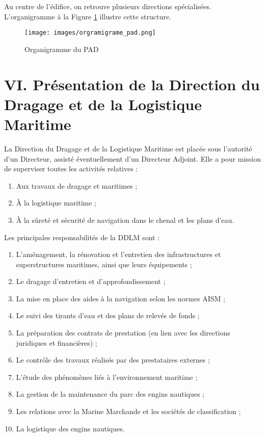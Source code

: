 \documentclass[a4paper,12pt,openany]{report}
\begin{document}
	Au centre de l’édifice, on retrouve plusieurs directions spécialisées. L'organigramme à la Figure \ref{Fig 2} illustre cette structure.
	
	\begin{figure}[h]
		\centering
		\texttt{[image: images/orgramigrame\_pad.png]}
		\caption{Organigramme du PAD \label{Fig 2}}
	\end{figure}
	
	\section*{VI. Présentation de la Direction du Dragage et de la Logistique Maritime }
	
	La Direction du Dragage et de la Logistique Maritime   est placée sous l’autorité d’un Directeur, assisté éventuellement d’un Directeur Adjoint. Elle a pour mission de superviser toutes les activités relatives :
	
	\begin{enumerate}
		\item Aux travaux de dragage et maritimes ;
		\item À la logistique maritime ;
		\item À la sûreté et sécurité de navigation dans le chenal et les plans d’eau.
	\end{enumerate}
	
	Les principales responsabilités de la DDLM sont :
	
	\begin{enumerate}
		\item L’aménagement, la rénovation et l’entretien des infrastructures et superstructures maritimes, ainsi que leurs équipements ;
		\item Le dragage d’entretien et d’approfondissement ;
		\item La mise en place des aides à la navigation selon les normes AISM ;
		\item Le suivi des tirants d’eau et des plans de relevés de fonds ;
		\item La préparation des contrats de prestation (en lien avec les directions juridiques et financières) ;
		\item Le contrôle des travaux réalisés par des prestataires externes ;
		\item L’étude des phénomènes liés à l’environnement maritime ;
		\item La gestion de la maintenance du parc des engins nautiques ;
		\item Les relations avec la Marine Marchande et les sociétés de classification ;
		\item La logistique des engins nautiques.
	\end{enumerate}
%	
%
\end{document}
